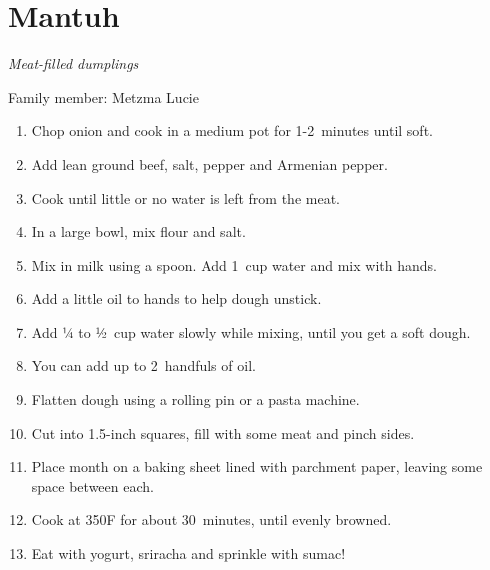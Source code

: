 \chapter{Mantuh}
\label{ch:mantuh}


\textit{Meat-filled dumplings}

Family member: Metzma Lucie

\begin{enumerate}
    \item Chop onion and cook in a medium pot for 1-2~minutes until soft.
    \item Add lean ground beef, salt, pepper and Armenian pepper.
    \item Cook until little or no water is left from the meat.

    \item In a large bowl, mix flour and salt.
    \item Mix in milk using a spoon. Add 1~cup water and mix with hands.
    \item Add a little oil to hands to help dough unstick.
    \item Add ¼ to ½~cup water slowly while mixing, until you get a soft dough.
    \item You can add up to 2~handfuls of oil.

    \item Flatten dough using a rolling pin or a pasta machine.
    \item Cut into 1.5-inch squares, fill with some meat and pinch sides.
    \item Place month on a baking sheet lined with parchment paper, leaving some space between each.
    \item Cook at 350\degree F for about 30~minutes, until evenly browned.
    \item Eat with yogurt, sriracha and sprinkle with sumac!
\end{enumerate}

